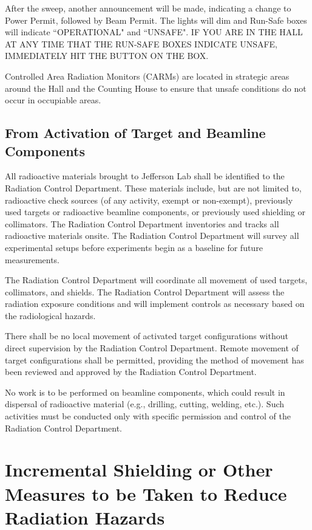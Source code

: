 \documentclass [12pt]{article}
\begin{document}
After the sweep, another announcement will be made, indicating a change to Power Permit, followed 
by Beam Permit. The lights will dim and Run-Safe boxes will indicate ``OPERATIONAL" and ``UNSAFE". 
IF YOU ARE IN THE HALL AT ANY TIME THAT THE RUN-SAFE BOXES INDICATE UNSAFE, IMMEDIATELY HIT THE 
BUTTON ON THE BOX. 

Controlled Area Radiation Monitors (CARMs) are located in strategic areas around the Hall and the 
Counting House to ensure that unsafe conditions do not occur in occupiable areas. 

\subsection{From Activation of Target and Beamline Components}

All radioactive materials brought to Jefferson Lab shall be identified to the Radiation Control 
Department. These materials include, but are not limited to, radioactive check sources (of any 
activity, exempt or non-exempt), previously used targets or radioactive beamline components, or 
previously used shielding or collimators. The Radiation Control Department inventories and tracks 
all radioactive materials onsite. The Radiation Control Department will survey all experimental 
setups before experiments begin as a baseline for future measurements. 

The Radiation Control Department will coordinate all movement of used targets, collimators, and 
shields. The Radiation Control Department will assess the radiation exposure conditions and will 
implement controls as necessary based on the radiological hazards. 

There shall be no local movement of activated target configurations without direct supervision by 
the Radiation Control Department. Remote movement of target configurations shall be permitted, 
providing the method of movement has been reviewed and approved by the Radiation Control Department. 

No work is to be performed on beamline components, which could result in dispersal of radioactive 
material (e.g., drilling, cutting, welding, etc.). Such activities must be conducted only with 
specific permission and control of the Radiation Control Department. 

\section{Incremental Shielding or Other Measures to be Taken to Reduce Radiation Hazards} 
\end{document}
